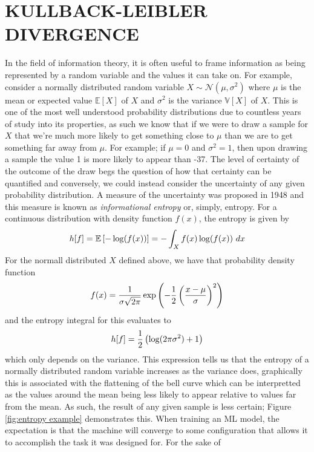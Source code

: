 \chapter{KULLBACK-LEIBLER DIVERGENCE}
\label{chap:KLD}
In the field of information theory, it is often useful to frame information as being 
represented by a random variable and the values it can take on. For example, consider 
a normally distributed random variable $X \sim \mathcal{N}(\mu, \sigma^2)$ where $\mu$ is the 
mean or expected value $\mathbb{E}[X]$ of $X$ and $\sigma^2$ is the variance 
$\mathbb{V}[X]$ of $X$. This is one of the most well understood probability distributions
due to countless years of study into its properties, as such we know that if we were to 
draw a sample for $X$ that we're much more likely to get something close to $\mu$
than we are to get something far away from $\mu$. For example; if $\mu = 0$ and 
$\sigma^2 = 1$, then upon drawing a sample the value 1 is more likely to appear
than -37. The level of certainty of the outcome of the draw begs the question of 
how that certainty can be quantified and conversely, we could instead consider the 
uncertainty of any given probability distribution. A measure of the uncertainty was 
proposed in 1948 and this measure is known as \emph{informational entropy} \cite{shannon}
or, simply, entropy. For a
continuous distribution with density function $f(x)$, the entropy is given by 
\begin{equation}
    h[f] = \mathbb{E}\left[-\log(f(x))\right] = -\int_X f(x)\log(f(x))\ dx    
\end{equation}
For the normall distributed $X$ defined above, we have that probability density function
\begin{equation}
   f(x) = \frac{1}{\sigma\sqrt{2\pi}}\exp\left(-\frac{1}{2}\left(\frac{x-\mu}{\sigma}\right)^2\right) \label{eqn:normal} 
\end{equation}
and the entropy integral for this evaluates to
\begin{equation}
    h[f] = \frac{1}{2}\left(\log(2\pi\sigma^2) + 1\right)
\end{equation}
which only depends on the variance. This expression tells us that the entropy of a
normally distributed random variable increases as the variance does, graphically this is 
associated with the flattening of the bell curve which can be interpretted as the values 
around the mean being less likely to appear relative to values far from the mean. As such, 
the result of any given sample is less certain; Figure \ref{fig:entropy example} demonstrates 
this.
When training an ML model, the expectation is that the machine will converge to some 
configuration that allows it to accomplish the task it was designed for. For the sake of 

